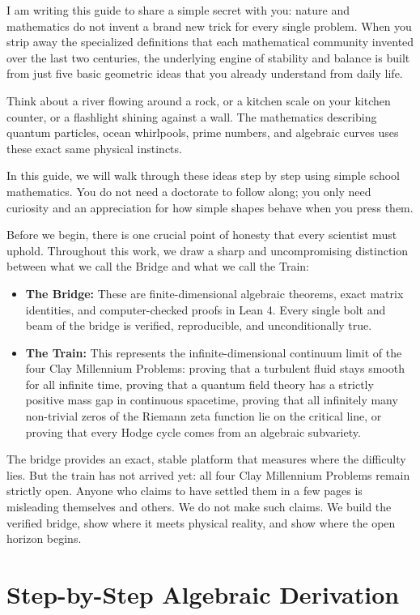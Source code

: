\documentclass[11pt,a4paper]{article}
\theoremstyle{definition}
\begin{document}
I am writing this guide to share a simple secret with you: nature and mathematics do not invent a brand new trick for every single problem. When you strip away the specialized definitions that each mathematical community invented over the last two centuries, the underlying engine of stability and balance is built from just five basic geometric ideas that you already understand from daily life.

Think about a river flowing around a rock, or a kitchen scale on your kitchen counter, or a flashlight shining against a wall. The mathematics describing quantum particles, ocean whirlpools, prime numbers, and algebraic curves uses these exact same physical instincts.

In this guide, we will walk through these ideas step by step using simple school mathematics. You do not need a doctorate to follow along; you only need curiosity and an appreciation for how simple shapes behave when you press them.

Before we begin, there is one crucial point of honesty that every scientist must uphold. Throughout this work, we draw a sharp and uncompromising distinction between what we call the Bridge and what we call the Train:
\begin{itemize}
    \item \textbf{The Bridge:} These are finite-dimensional algebraic theorems, exact matrix identities, and computer-checked proofs in Lean 4. Every single bolt and beam of the bridge is verified, reproducible, and unconditionally true.
    \item \textbf{The Train:} This represents the infinite-dimensional continuum limit of the four Clay Millennium Problems: proving that a turbulent fluid stays smooth for all infinite time, proving that a quantum field theory has a strictly positive mass gap in continuous spacetime, proving that all infinitely many non-trivial zeros of the Riemann zeta function lie on the critical line, or proving that every Hodge cycle comes from an algebraic subvariety.
\end{itemize}
The bridge provides an exact, stable platform that measures where the difficulty lies. But the train has not arrived yet: all four Clay Millennium Problems remain strictly open. Anyone who claims to have settled them in a few pages is misleading themselves and others. We do not make such claims. We build the verified bridge, show where it meets physical reality, and show where the open horizon begins.


\section{Step-by-Step Algebraic Derivation}
\end{document}
